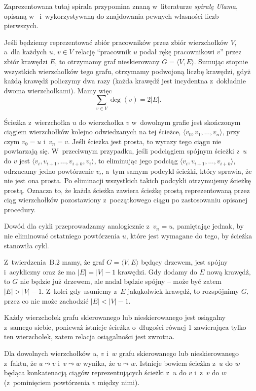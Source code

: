 Zaprezentowana tutaj spirala przypomina znaną w~literaturze \emph{spiralę Ulama}, opisaną w~\cite{ulamspiral} i~wykorzystywaną do znajdowania pewnych własności liczb pierwszych.


\exercise %
Jeśli będziemy reprezentować zbiór pracowników przez zbiór wierzchołków $V$, a~dla każdych $u$, $v\in V$ relację ``pracownik $u$ podał rękę pracownikowi $v$'' przez zbiór krawędzi $E$, to otrzymamy graf nieskierowany $G=\langle V,E\rangle$. Sumując stopnie wszystkich wierzchołków tego grafu, otrzymamy podwojoną liczbę krawędzi, gdyż każdą krawędź policzymy dwa razy (każda krawędź jest incydentna z~dokładnie dwoma wierzchołkami). Mamy więc
\[
	\sum_{v\in V}\deg(v) = 2|E|.
\]

\exercise %
Ścieżka z~wierzchołka $u$ do wierzchołka $v$ w~dowolnym grafie jest skończonym ciągiem wierzchołków kolejno odwiedzanych na tej ścieżce, $\langle v_0,v_1,\dots,v_n\rangle$, przy czym $v_0=u$ i~$v_n=v$. Jeśli ścieżka jest prosta, to wyrazy tego ciągu nie powtarzają się. W~przeciwnym przypadku, jeśli podciągiem spójnym ścieżki z~$u$ do $v$ jest $\langle v_i,v_{i+1},\dots,v_{i+k},v_i\rangle$, to eliminując jego podciąg $\langle v_i,v_{i+1},\dots,v_{i+k}\rangle$, odrzucamy jedno powtórzenie $v_i$, a~tym samym podcykl ścieżki, który sprawia, że nie jest ona prosta. Po eliminacji wszystkich takich podcykli otrzymujemy ścieżkę prostą. Oznacza to, że każda ścieżka zawiera ścieżkę prostą reprezentowaną przez ciąg wierzchołków pozostawiony z~początkowego ciągu po zastosowaniu opisanej procedury.

Dowód dla cykli przeprowadzamy analogicznie z~$v_n=u$, pamiętając jednak, by nie eliminować ostatniego powtórzenia $u$, które jest wymagane do tego, by ścieżka stanowiła cykl.

\exercise %
Z~twierdzenia~B.2 mamy, że graf $G=\langle V,E\rangle$ będący drzewem, jest spójny i~acykliczny oraz że ma $|E|=|V|-1$ krawędzi. Gdy dodamy do $E$ nową krawędź, to $G$ nie będzie już drzewem, ale nadal będzie spójny -- może być zatem $|E|>|V|-1$. Z~kolei gdy usuniemy z~$E$ jakąkolwiek krawędź, to rozspójnimy $G$, przez co nie może zachodzić $|E|<|V|-1$.

\exercise %
Każdy wierzchołek grafu skierowanego lub nieskierowanego jest osiągalny z~samego siebie, ponieważ istnieje ścieżka o~długości równej 1 zawierająca tylko ten wierzchołek, zatem relacja osiągalności jest zwrotna.

Dla dowolnych wierzchołków $u$, $v$ i~$w$ grafu skierowanego lub nieskierowanego z~faktu, że $u\leadsto v$ i~$v\leadsto w$ wynika, że $u\leadsto w$. Istnieje bowiem ścieżka z~$u$ do $w$ będąca konkatenacją ciągów reprezentujących ścieżki z~$u$ do $v$ i~z~$v$ do $w$ (z~pominięciem powtórzenia $v$ między nimi).

